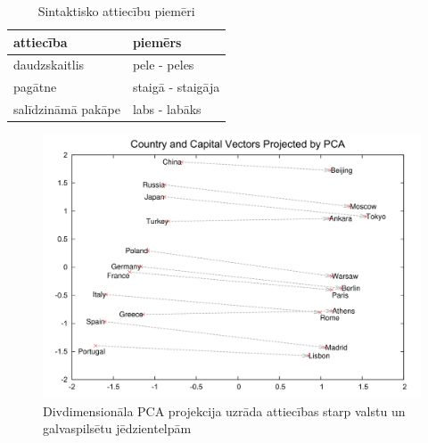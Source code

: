 \begin{table}[htbp]
	\centering
	\caption{Sintaktisko attiecību piemēri}
	\begin{tabular}{ll}\toprule
		attiecība & piemērs  \\\midrule
		daudzskaitlis   & pele - peles \\
		pagātne   & staigā - staigāja \\
		salīdzināmā pakāpe   & labs - labāks \\\bottomrule
	\end{tabular}%
	\label{tab:semantic-relationship-examples}%
\end{table}


\begin{figure}[h]
	\centering
	\includegraphics[width=\textwidth]{figures/word2vec-country-capital.png}
	\caption{Divdimensionāla PCA projekcija uzrāda attiecības starp valstu un galvaspilsētu jēdzientelpām}
\end{figure}

